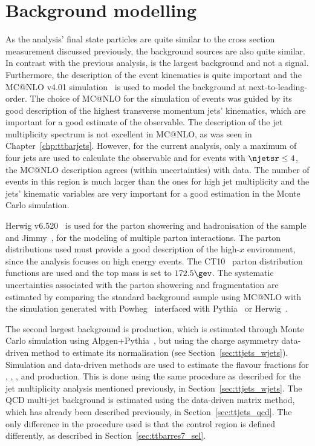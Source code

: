 \section{Background modelling}
\label{sec:ttbarres7_bkg}

As the analysis' final state particles are quite similar to the \ttbarjets cross section measurement discussed previously, the background sources are also quite similar.
In contrast with the previous analysis, \ttbar is the largest background and not a signal.
Furthermore, the description of the event kinematics is quite important and the MC@NLO v4.01 simulation~\cite{mcatnlo4_gen}
is used to model the \ttbar background at next-to-leading-order.
The choice of MC@NLO for the simulation of \ttbar events was guided by its good description of the highest transverse momentum jets' kinematics,
which are important for a good estimate of the \mtt observable.
The description of the jet multiplicity spectrum is not excellent in MC@NLO, as was seen in Chapter~\ref{chp:ttbarjets}.
However, for the current analysis, only a maximum of four jets are used to calculate the \mtt observable and for events with $\njetsr \leq 4$, the MC@NLO
description agrees (within uncertainties) with data. The number of events in this region is much larger than the ones for high jet multiplicity and the
jets' kinematic variables are very important for a good \mtt estimation in the Monte Carlo simulation.

Herwig v6.520~\cite{herwig1,herwig2}
is used for the parton showering and hadronisation of the \ttbar sample and Jimmy~\cite{jimmy}, for the modeling of multiple parton interactions.
The parton distributions used must provide a good description of the high-$x$
environment, since the analysis focuses on high energy events.
The CT10~\cite{cteq6}
parton distribution
functions are used and the top mass is set to $172.5\gev$. The systematic uncertainties associated with the parton showering and fragmentation are estimated by
comparing the standard \ttbar background sample using MC@NLO with the simulation generated with Powheg~\cite{powheg} interfaced with Pythia~\cite{pythia}
or Herwig~\cite{herwig1,herwig2}.

The second largest background is \wjets production, which is estimated through Monte Carlo simulation using Alpgen+Pythia~\cite{alpgen,pythia},
but using the charge asymmetry data-driven method
to estimate its normalisation (see Section~\ref{sec:ttjets_wjets}).
Simulation and data-driven methods are used to estimate the flavour fractions for \wbjets, \wbbjets, \wcjets, \wccjets and \wljets
production. This is done using the same procedure as described for the jet multiplicity analysis mentioned previously, in Section~\ref{sec:ttjets_wjets}.
The QCD multi-jet background is estimated using the data-driven matrix method, which has already been described previously, in Section~\ref{sec:ttjets_qcd}.
The only difference
in the procedure used is that the control region is defined differently, as described in Section~\ref{sec:ttbarres7_sel}.

